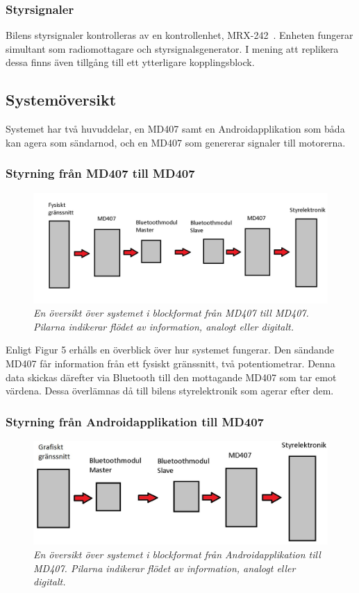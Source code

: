 \documentclass[a4paper]{article}
\begin{document}
\subsubsection{Styrsignaler}
Bilens styrsignaler kontrolleras av en kontrollenhet, MRX-242~\cite{projektDir}. Enheten fungerar simultant som radiomottagare och styrsignalsgenerator. I mening att replikera dessa finns även tillgång till ett ytterligare kopplingsblock.


\subsection{Systemöversikt}
Systemet har två huvuddelar, en MD407 samt en Androidapplikation som båda kan agera som sändarnod, och en MD407 som genererar signaler till motorerna.

\subsubsection{Styrning från MD407 till MD407}
\begin{figure}[H]
\includegraphics[width=\textwidth]{systemoversikt.jpg}
\centering
\caption{\it En översikt över systemet i blockformat från MD407 till MD407. Pilarna indikerar flödet av information, analogt eller digitalt.}
\end{figure}


Enligt Figur 5 erhålls en överblick över hur systemet fungerar. Den sändande MD407 får information från ett fysiskt gränssnitt, två potentiometrar. Denna data skickas därefter via Bluetooth till den mottagande MD407 som tar emot värdena. Dessa överlämnas då till bilens styrelektronik som agerar efter dem.

\subsubsection{Styrning från Androidapplikation till MD407}
\begin{figure}[H]
\includegraphics[width=\textwidth]{systemoversiktAndroid.jpg}
\centering
\caption{\it En översikt över systemet i blockformat från Androidapplikation till MD407. Pilarna indikerar flödet av information, analogt eller digitalt.}
\end{figure}
\end{document}
